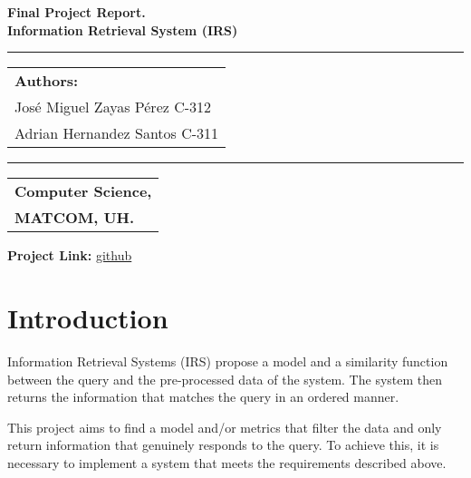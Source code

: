 \documentclass{llncs}
\begin{document}
\thispagestyle{empty}

\begin{flushleft}
\Huge\bfseries Final Project Report.\\
Information Retrieval System (IRS) \\[3pt]
\end{flushleft}
\rule{\textwidth}{1pt}
\vspace{2pt}
\begin{flushright}
\huge
\begin{tabular}{@{}l}
\textbf{Authors:} \\
José Miguel Zayas Pérez C-312\\
Adrian Hernandez Santos C-311 \\[2pt]
\end{tabular}
\end{flushright}
\vspace{5pt}
\rule{\textwidth}{1pt}
\vspace{3pt}

\begin{flushright}
\huge
\begin{tabular}{@{}l}
\textbf{Computer Science,}\\
\textbf{MATCOM, UH.} \\
\end{tabular}
\end{flushright}

\vspace{2cm} %
\begin{flushleft}
\large\textbf{Project Link:} \href{https://github.com/josem-nex/irs-project/}{github}
\end{flushleft}

\newpage
\tableofcontents
\newpage

\section{Introduction}

Information Retrieval Systems (IRS) propose a model and a similarity function between the query and the pre-processed data of the system. The system then returns the information that matches the query in an ordered manner.

This project aims to find a model and/or metrics that filter the data and only return information that genuinely responds to the query. To achieve this, it is necessary to implement a system that meets the requirements described above.
\end{document}

